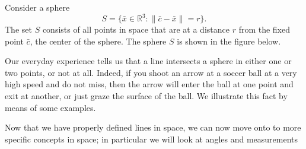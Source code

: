 Consider a sphere
\[
S = \{\bar{x} \in \mathbb{R}^3 : \|\bar{c} - \bar{x}\| = r\}.
\]
The set \(S\) consists of all points in space that are at a distance \(r\) from the fixed point \(\bar{c}\), the center of the sphere. The sphere \(S\) is shown in the figure below.


Our everyday experience tells us that a line intersects a sphere in either one or two points, or not at all. Indeed, if you shoot an arrow at a soccer ball at a very high speed and do not miss, then the arrow will enter the ball at one point and exit at another, or just graze the surface of the ball. We illustrate this fact by means of some examples.




Now that we have properly defined lines in space, we can now move onto to more specific concepts in space; in particular we will look at angles and measurements
\newpage

